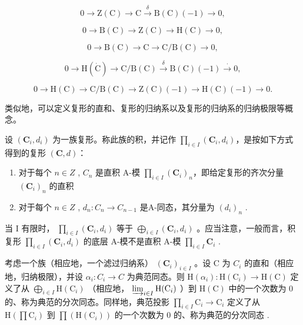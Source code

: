 \[
0 \longrightarrow \mathrm{Z} (\mathrm{C}) \longrightarrow \mathrm{C} \stackrel {\delta} {\longrightarrow} \mathrm{B} (\mathrm{C}) (- 1) \longrightarrow 0,\tag{II}
\]

\[
0 \longrightarrow \mathrm{B} (\mathrm{C}) \longrightarrow \mathrm{Z} (\mathrm{C}) \longrightarrow \mathrm{H} (\mathrm{C}) \longrightarrow 0,\tag{III}
\]

\[
0 \longrightarrow \mathrm{B} (\mathrm{C}) \longrightarrow \mathrm{C} \longrightarrow \mathrm{C} / \mathrm{B} (\mathrm{C}) \longrightarrow 0,\tag{IV}
\]

\[
0 \longrightarrow \mathrm{H} (\dot {\mathrm{C}}) \longrightarrow \mathrm{C} / \mathrm{B} (\mathrm{C}) \stackrel {\delta} {\longrightarrow} \mathrm{B} (\mathrm{C}) (- 1) \stackrel {\cdot} {\longrightarrow} 0,\tag{V}
\]

\[
0 \longrightarrow \mathrm{H} (\mathrm{C}) \longrightarrow \mathrm{C} / \mathrm{B} (\mathrm{C}) \longrightarrow \mathrm{Z} (\mathrm{C}) (- 1) \longrightarrow \mathrm{H} (\mathrm{C}) (- 1) \longrightarrow 0.
\]

类似地，可以定义复形的直和、复形的归纳系以及复形的归纳系的归纳极限等概念。

设 \((\mathbf{C}_{i}, d_{i})\) 为一族复形。称此族的积，并记作 \(\prod_{i \in I} (\mathbf{C}_{i}, d_{i})\)，是按如下方式得到的复形 \((\mathbf{C}, d)\)：

\begin{enumerate}
\def\labelenumi{\alph{enumi})}
\item
  对于每个 \(n \in Z\) , \(C_{n}\) 是直积 A-模 \(\prod_{i \in I} (\mathbf{C}_{i})_{n}\)，即给定复形的齐次分量 \((\mathbf{C}_{i})_{n}\) 的直积
\item
  对于每个 \(n \in Z\) , \(d_{n} : C_{n} \to C_{n-1}\) 是A-同态，其分量为 \((d_{i})_{n}\) .
\end{enumerate}

当 I 有限时， \(\prod_{i\in I}(\mathbf{C}_{i},d_{i})\) 等于 \(\bigoplus_{i\in I}(\mathbf{C}_{i},d_{i})\) 。应当注意，一般而言，积复形 \(\prod_{i\in I}(\mathbf{C}_{i},d_{i})\) 的底层 A-模不是直积 A-模 \(\prod_{i\in I}\mathbf{C}_{i}\) .

考虑一个族（相应地，一个滤过归纳系） \((\mathbf{C}_i)_{i\in I}\) 。设 C 为 \(C_i\) 的直和（相应地，归纳极限），并设 \(\alpha_{i}:C_{i}\to C\) 为典范同态。则 \(\mathrm{H}(\alpha_{i}): \mathrm{H}(\mathrm{C}_{i})\to \mathrm{H}(\mathrm{C})\) 定义了从 \(\bigoplus_{i\in I}\mathrm{H}(\mathrm{C}_{i})\) （相应地， \(\varinjlim_{i\in I}\mathrm{H}(\mathrm{C}_{i})\) ）到 \(\mathrm{H}(\mathrm{C})\) 中的一个次数为 0 的、称为典范的分次同态。同样地，典范投影 \(\prod_{i\in I}\mathrm{C}_{i}\to \mathrm{C}_{i}\) 定义了从 \(\mathrm{H}(\prod \mathrm{C}_i)\) 到 \(\prod (\mathrm{H}(\mathrm{C}_i))\) 的一个次数为 0 的、称为典范的分次同态 .

